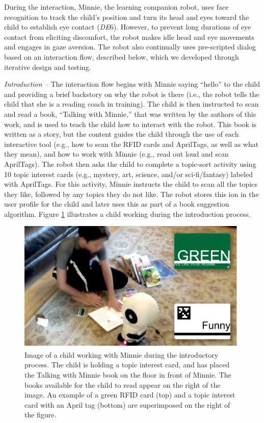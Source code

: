 \documentclass{sigchi}
\begin{document}
During the interaction, Minnie, the learning companion robot, uses face recognition to track the child's position and turn its head and eyes toward the child to establish eye contact (\textit{DE}6). However, to prevent long durations of eye contact from eliciting discomfort, the robot makes idle head and eye movements and engages in gaze aversion. The robot also continually uses pre-scripted dialog based on an interaction flow, described below, which we developed through iterative design and testing.

\textit{Introduction --} The interaction flow begins with Minnie saying ``hello'' to the child and providing a brief backstory on why the robot is there (i.e., the robot tells the child that she is a reading coach in training). The child is then instructed to scan and read a book, ``Talking with Minnie,'' that was written by the authors of this work, and is used to teach the child how to interact with the robot. This book is written as a story, but the content guides the child through the use of each interactive tool (e.g., how to scan the RFID cards and AprilTags, as well as what they mean), and how to work with Minnie (e.g., read out loud and scan AprilTags). The robot then asks the child to complete a topic-sort activity using 10 topic interest cards (e.g., mystery, art, science, and/or sci-fi/fantasy) labeled with AprilTags. For this activity, Minnie instructs the child to scan all the topics they like, followed by any topics they do not like. The robot stores this ion in the user profile for the child and later uses this as part of a book suggestion algorithm. Figure \ref{fig:introduction} illustrates a child working during the introduction process.

\begin{figure}
	\centering
	\includegraphics[width=1\columnwidth]{figures/chi17-michaelis-figures-cards.jpg}
	\caption{Image of a child working with Minnie during the introductory process. The child is holding a topic interest card, and has placed the Talking with Minnie book on the floor in front of Minnie. The books available for the child to read appear on the right of the image. An example of a green RFID card (top) and a topic interest card with an April tag (bottom) are superimposed on the right of the figure.}
	\label{fig:introduction}
\end{figure}
\end{document}

